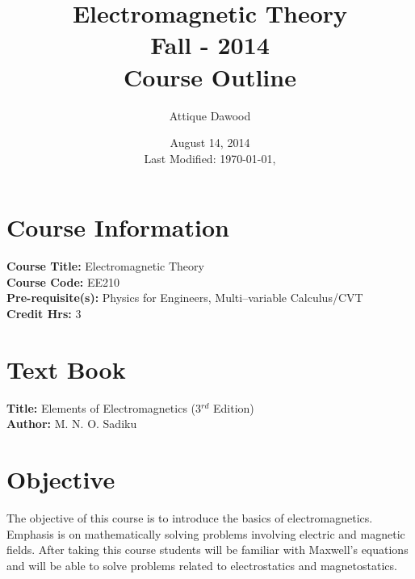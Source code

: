 \documentclass[12pt,a4paper]{article}
\title{\vspace{-1.5cm}Electromagnetic Theory\\Fall - 2014\\Course Outline}
\author{Attique Dawood}
\date{August 14, 2014\\[0.2cm] Last Modified: \today, \currenttime}
\begin{document}
\maketitle
\section{Course Information}
\noindent\textbf{Course Title:} Electromagnetic Theory\\
\textbf{Course Code:} EE210\\
\textbf{Pre-requisite(s):} Physics for Engineers, Multi--variable Calculus/CVT\\
\textbf{Credit Hrs:} 3\\
\section{Text Book}
\textbf{Title:} Elements of Electromagnetics (3$^{rd}$ Edition)\\
\textbf{Author:} M. N. O. Sadiku\\[0.5cm]
\section{Objective}
The objective of this course is to introduce the basics of electromagnetics. Emphasis is on mathematically solving problems involving electric and magnetic fields. After taking this course students will be familiar with Maxwell's equations and will be able to solve problems related to electrostatics and magnetostatics.
\end{document}
